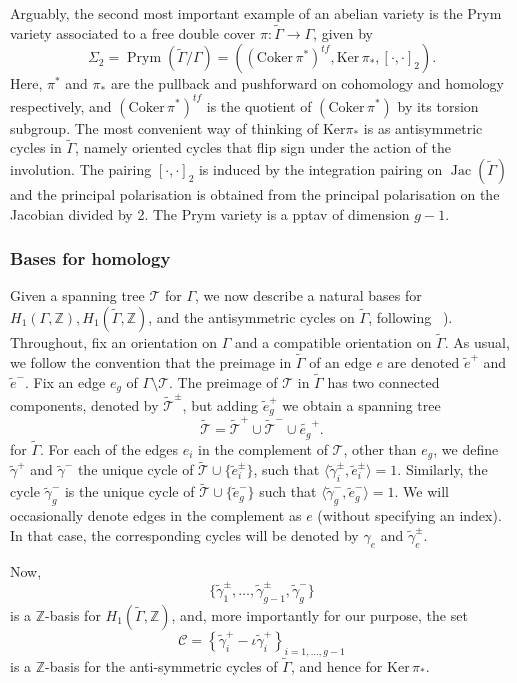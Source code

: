 \documentclass[11pt]{article}
\theoremstyle{definition}
\numberwithin{equation}{section}
\theoremstyle{definition}
\newcommand{\ZZ}{\mathbb{Z}}
\newcommand{\tGa}{\widetilde{\Gamma}}
\newcommand{\tga}{\widetilde{\gamma}}
\newcommand{\Ga}{\Gamma}
\newcommand{\calC}{\mathcal{C}}
\newcommand{\calT}{\mathcal{T}}
\newcommand{\wt}[1]{\widetilde{#1}}
\DeclareMathOperator{\Prym}{Prym}
\DeclareMathOperator{\Jac}{Jac}
\begin{document}
Arguably, the second most important example of an abelian variety is the  Prym variety  associated to a free double cover $\pi\colon \tGa \to \Ga$,  given by
\[ 
\Sigma_2=\Prym(\tGa/\Ga)=((\text{Coker}\,\pi^*)^{tf},\mathrm{Ker}\,\pi_*,[\cdot,\cdot]_2).
\]
Here, $\pi^*$ and $\pi_*$ are the pullback and pushforward on cohomology and homology respectively, and $(\text{Coker}\,\pi^*)^{tf}$ is the quotient of $(\text{Coker}\,\pi^*)$ by its torsion subgroup. The most convenient way of thinking of $\mathrm{Ker}\pi_*$ is as antisymmetric cycles in $\wt\Gamma$, namely oriented cycles that flip sign under the action of the involution. The pairing $[\cdot,\cdot]_2$ is induced by the integration pairing on $\Jac(\tGa)$ and the principal polarisation is obtained from the principal polarisation on the Jacobian  divided by 2. The Prym variety is a pptav of dimension $g-1$. 


\subsubsection{Bases for homology}
Given a spanning tree $\calT$ for $\Gamma$, we now describe a
natural bases for $H_1(\Gamma,\ZZ), H_1(\wt\Gamma,\ZZ)$, and the antisymmetric cycles on $\wt\Gamma$, following ~\cite[Construction B]{LZ22}). Throughout, fix an orientation on $\Gamma$ and a compatible orientation on $\wt\Gamma$.
As usual, we follow the convention that the preimage in $\wt\Gamma$ of an edge $e$ are denoted $\tilde e^+$ and $\tilde e^-$. 
Fix an edge $e_g$   of $\Gamma\setminus \calT$.  
 The preimage of $\calT$ in $\wt\Gamma$ has two connected components, denoted by 
$\wt{\calT}^{\pm}$, but adding $\wt e_g^+$ we obtain a spanning tree
\[
\widetilde{\calT}=\widetilde{\calT}^{+}\cup\widetilde{\calT}^{-}\cup \wt{e_g}^+.
\]
for $\wt\Gamma$.
For each of the edges $e_i$ in the complement of $\calT$, other than $e_g$, we define $\wt\gamma^+$ and $\wt\gamma^-$  the unique cycle 
of $\widetilde{\calT}\cup \{\widetilde{e}_{i}^{\pm}\}$, such that $\langle\tga_{i}^{\pm},\widetilde{e}_{i}^{\pm}\rangle=1$. Similarly, the cycle $\wt\gamma_g^-$ is the unique cycle of $\widetilde{\calT}\cup \{\widetilde{e}_{g}^{-}\}$ such that $\langle\tga_{g}^{-},\widetilde{e}_{g}^{-}\rangle=1$.   We will occasionally denote edges in the complement as $e$ (without specifying an index). In that  case, the corresponding cycles will be denoted by $\gamma_e$ and $\tilde\gamma_e^{\pm}$.


Now,
\begin{equation*}
    \{\tga^{\pm}_{1},\dots, \tga^{\pm}_{g-1}, \tga_g^-\}
\end{equation*}
is a $\ZZ$-basis for $H_1(\widetilde{\Gamma},\ZZ)$, and, more importantly for our purpose,  the set
\[
\calC = \left\{\wt\gamma_i^+ - \iota\wt\gamma_i^+\right\}_{i=1,\ldots,g-1}
\]
is a $\ZZ$-basis for the anti-symmetric cycles of $\wt\Gamma$, and hence for $\mathrm{Ker}\,\pi_*$. 
\end{document}
